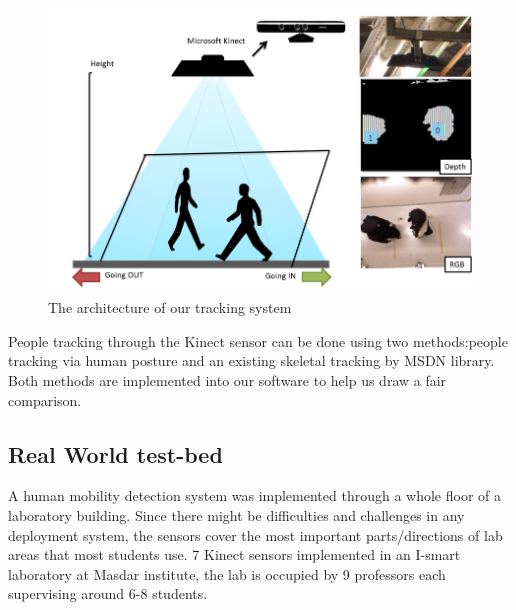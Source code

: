 \begin{figure} [!ht]
  \begin{center}
	  	\includegraphics[width=0.9\columnwidth]{./images/minisys.png}
  \end{center}
  \caption{The architecture of our tracking system}\label{fig:minisys}
\end{figure}

People tracking through the Kinect sensor can be done using two methods:people tracking via human posture and an existing skeletal tracking by MSDN library. Both methods are implemented into our software to help us draw a fair comparison.

\subsection{Real World test-bed}
A human mobility detection system was implemented through a whole floor of a laboratory building. Since there might be difficulties and challenges in any deployment system, the sensors cover the most important parts/directions of lab areas that most students use. 7 Kinect sensors implemented in an I-smart laboratory at Masdar institute, the lab is occupied by 9 professors each supervising around 6-8 students.

